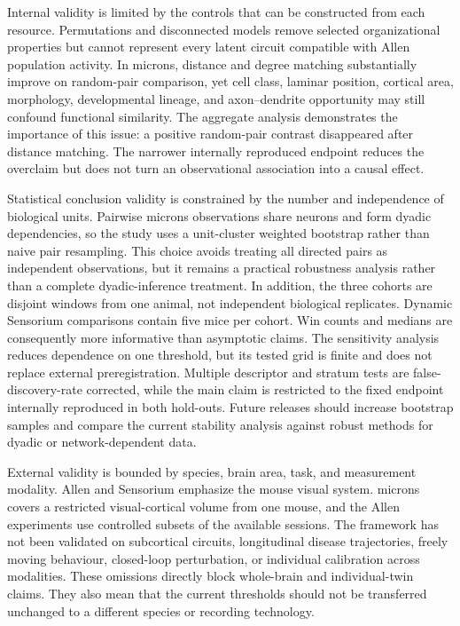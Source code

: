 \documentclass[a4paper,fleqn]{cas-sc}
\begin{document}
Internal validity is limited by the controls that can be constructed from each
resource. Permutations and disconnected models remove selected organizational
properties but cannot represent every latent circuit compatible with Allen
population activity. In \acs{microns}, distance and degree matching substantially
improve on random-pair comparison, yet cell class, laminar position, cortical
area, morphology, developmental lineage, and axon--dendrite opportunity may
still confound functional similarity. The aggregate analysis demonstrates the
importance of this issue: a positive random-pair contrast disappeared after
distance matching. The narrower internally reproduced endpoint reduces the overclaim but
does not turn an observational association into a causal effect.

Statistical conclusion validity is constrained by the number and independence
of biological units. Pairwise \acs{microns} observations share neurons and form
dyadic dependencies, so the study uses a unit-cluster weighted bootstrap rather
than naive pair resampling. This choice avoids treating all directed pairs as
independent observations, but it remains a practical robustness analysis rather
than a complete dyadic-inference treatment. In addition, the three cohorts are
disjoint windows from one animal, not independent biological replicates. Dynamic
Sensorium comparisons contain five mice per cohort. Win counts and medians are
consequently more informative than asymptotic claims. The sensitivity analysis
reduces dependence on one threshold, but its tested grid is finite and does not
replace external preregistration. Multiple descriptor and stratum tests are
false-discovery-rate corrected, while the main claim is restricted to the fixed
endpoint internally reproduced in both hold-outs. Future releases should
increase bootstrap samples and compare the current stability analysis against
robust methods for dyadic or network-dependent data.

External validity is bounded by species, brain area, task, and measurement
modality. Allen and Sensorium emphasize the mouse visual system. \acs{microns} covers
a restricted visual-cortical volume from one mouse, and the Allen experiments
use controlled subsets of the available sessions. The framework has not been
validated on subcortical circuits, longitudinal disease trajectories, freely
moving behaviour, closed-loop perturbation, or individual calibration across
modalities. These omissions directly block whole-brain and individual-twin
claims. They also mean that the current thresholds should not be transferred
unchanged to a different species or recording technology.
\end{document}

